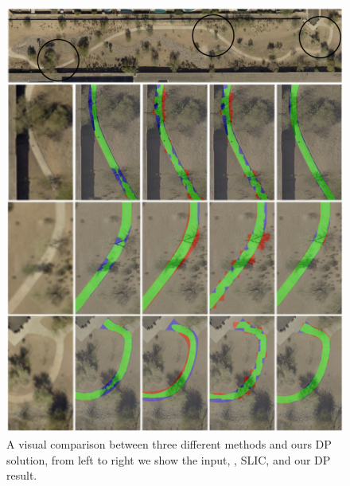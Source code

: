 \begin{figure}[htb]
    \centering
    \includegraphics[width=0.95\columnwidth]{Figures/4_comparison.pdf}
    \caption[Methods Comparison on Sample Sidewalk]{A visual comparison between three different methods and ours \ac{DP} solution, from left to right we show the input, \GrabCut{}, \ac{SLIC}, \ActiveContours{} and our \ac{DP} result.}
    \label{fig:Sample_4_compare}
\end{figure}

